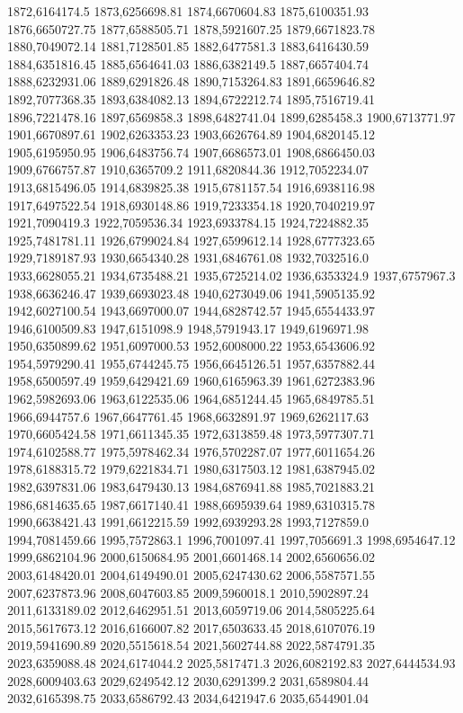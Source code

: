 1872,6164174.5
1873,6256698.81
1874,6670604.83
1875,6100351.93
1876,6650727.75
1877,6588505.71
1878,5921607.25
1879,6671823.78
1880,7049072.14
1881,7128501.85
1882,6477581.3
1883,6416430.59
1884,6351816.45
1885,6564641.03
1886,6382149.5
1887,6657404.74
1888,6232931.06
1889,6291826.48
1890,7153264.83
1891,6659646.82
1892,7077368.35
1893,6384082.13
1894,6722212.74
1895,7516719.41
1896,7221478.16
1897,6569858.3
1898,6482741.04
1899,6285458.3
1900,6713771.97
1901,6670897.61
1902,6263353.23
1903,6626764.89
1904,6820145.12
1905,6195950.95
1906,6483756.74
1907,6686573.01
1908,6866450.03
1909,6766757.87
1910,6365709.2
1911,6820844.36
1912,7052234.07
1913,6815496.05
1914,6839825.38
1915,6781157.54
1916,6938116.98
1917,6497522.54
1918,6930148.86
1919,7233354.18
1920,7040219.97
1921,7090419.3
1922,7059536.34
1923,6933784.15
1924,7224882.35
1925,7481781.11
1926,6799024.84
1927,6599612.14
1928,6777323.65
1929,7189187.93
1930,6654340.28
1931,6846761.08
1932,7032516.0
1933,6628055.21
1934,6735488.21
1935,6725214.02
1936,6353324.9
1937,6757967.3
1938,6636246.47
1939,6693023.48
1940,6273049.06
1941,5905135.92
1942,6027100.54
1943,6697000.07
1944,6828742.57
1945,6554433.97
1946,6100509.83
1947,6151098.9
1948,5791943.17
1949,6196971.98
1950,6350899.62
1951,6097000.53
1952,6008000.22
1953,6543606.92
1954,5979290.41
1955,6744245.75
1956,6645126.51
1957,6357882.44
1958,6500597.49
1959,6429421.69
1960,6165963.39
1961,6272383.96
1962,5982693.06
1963,6122535.06
1964,6851244.45
1965,6849785.51
1966,6944757.6
1967,6647761.45
1968,6632891.97
1969,6262117.63
1970,6605424.58
1971,6611345.35
1972,6313859.48
1973,5977307.71
1974,6102588.77
1975,5978462.34
1976,5702287.07
1977,6011654.26
1978,6188315.72
1979,6221834.71
1980,6317503.12
1981,6387945.02
1982,6397831.06
1983,6479430.13
1984,6876941.88
1985,7021883.21
1986,6814635.65
1987,6617140.41
1988,6695939.64
1989,6310315.78
1990,6638421.43
1991,6612215.59
1992,6939293.28
1993,7127859.0
1994,7081459.66
1995,7572863.1
1996,7001097.41
1997,7056691.3
1998,6954647.12
1999,6862104.96
2000,6150684.95
2001,6601468.14
2002,6560656.02
2003,6148420.01
2004,6149490.01
2005,6247430.62
2006,5587571.55
2007,6237873.96
2008,6047603.85
2009,5960018.1
2010,5902897.24
2011,6133189.02
2012,6462951.51
2013,6059719.06
2014,5805225.64
2015,5617673.12
2016,6166007.82
2017,6503633.45
2018,6107076.19
2019,5941690.89
2020,5515618.54
2021,5602744.88
2022,5874791.35
2023,6359088.48
2024,6174044.2
2025,5817471.3
2026,6082192.83
2027,6444534.93
2028,6009403.63
2029,6249542.12
2030,6291399.2
2031,6589804.44
2032,6165398.75
2033,6586792.43
2034,6421947.6
2035,6544901.04

